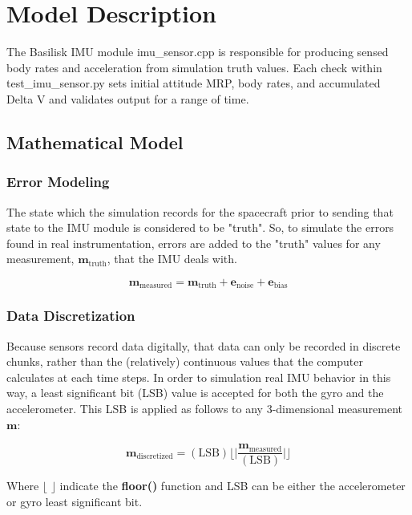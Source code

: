 \section{Model Description}
The Basilisk IMU module imu\_sensor.cpp is responsible for producing sensed body rates and acceleration from simulation truth values. Each check within test\_imu\_sensor.py sets initial attitude MRP, body rates, and accumulated Delta V and validates output for a range of time.

\subsection{Mathematical Model}

\subsubsection{Error Modeling}
The state which the simulation records for the spacecraft prior to sending that state to the IMU module is considered to be "truth". So, to simulate the errors found in real instrumentation, errors are added to the "truth" values for any measurement, $\mathbf{m}_{\mathrm{truth}}$, that the IMU deals with.

\begin{equation}
\mathbf{m}_{\mathrm{measured}} = \mathbf{m}_{\mathrm{truth}} + \mathbf{e}_{\mathrm{noise}} + \mathbf{e}_{\mathrm{bias}}
\end{equation}


\subsubsection{Data Discretization}
Because sensors record data digitally, that data can only be recorded in discrete chunks, rather than the (relatively) continuous values that the computer calculates at each time steps. In order to simulation real IMU behavior in this way, a least significant bit (LSB) value is accepted for both the gyro and the accelerometer. This LSB is applied as follows to any 3-dimensional measurement $\mathbf{m}$:

\begin{equation}
\mathbf{m}_{\mathrm{discretized}} = (\mathrm{LSB})\Biggl\lfloor\Biggl|\frac{\mathbf{m}_{\mathrm{measured}}}{(\mathrm{LSB})}\Biggr|\Biggr\rfloor
\end{equation}

Where $\lfloor$  $\rfloor$ indicate the \textbf{floor()} function and LSB can be either the accelerometer or gyro least significant bit.

